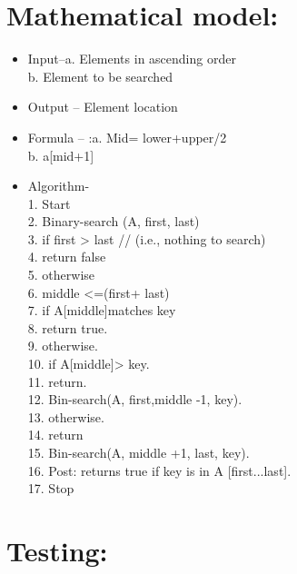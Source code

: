 \documentclass{article}
\begin{document}
	\section{Mathematical model:}
	\begin{itemize}
		
		\item Input–a. Elements in ascending order\\
		b. Element to be searched\\
		\item Output – Element location\\
		\item Formula – :a. Mid= lower+upper/2\\
		b. a[mid+1]\\
		\item Algorithm-\\
		1. Start\\
		2. Binary-search (A, first, last)\\
		3. if first > last // (i.e., nothing to search)\\
		4. return false\\
		5. otherwise\\
		6. middle <=(first+ last)\\
		7. if A[middle]matches key\\
		8. return true.\\
		9. otherwise.\\
		10. if A[middle]> key.\\
		11. return.\\
		12. Bin-search(A, first,middle -1, key).\\
		13. otherwise.\\
		14. return\\
		15. Bin-search(A, middle +1, last, key).\\
		16. Post: returns true if key is in A [first...last].\\
		17. Stop\\
	\end{itemize}         
	\section{Testing:}
\end{document}
